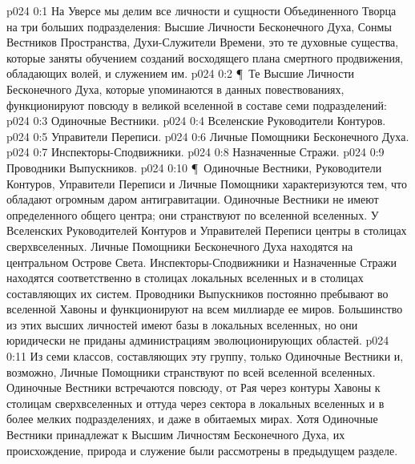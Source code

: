 \vs p024 0:1 На Уверсе мы делим все личности и сущности Объединенного Творца на три больших подразделения: Высшие Личности Бесконечного Духа, Сонмы Вестников Пространства, Духи\hyp{}Служители Времени, это те духовные существа, которые заняты обучением созданий восходящего плана смертного продвижения, обладающих волей, и служением им.
\vs p024 0:2 \P\ Те Высшие Личности Бесконечного Духа, которые упоминаются в данных повествованиях, функционируют повсюду в великой вселенной в составе семи подразделений:
\vs p024 0:3 \bibnobreakspace Одиночные Вестники.
\vs p024 0:4 \bibnobreakspace Вселенские Руководители Контуров.
\vs p024 0:5 \bibnobreakspace Управители Переписи.
\vs p024 0:6 \bibnobreakspace Личные Помощники Бесконечного Духа.
\vs p024 0:7 \bibnobreakspace Инспекторы\hyp{}Сподвижники.
\vs p024 0:8 \bibnobreakspace Назначенные Стражи.
\vs p024 0:9 \bibnobreakspace Проводники Выпускников.
\vs p024 0:10 \P\ Одиночные Вестники, Руководители Контуров, Управители Переписи и Личные Помощники характеризуются тем, что обладают огромным даром антигравитации. Одиночные Вестники не имеют определенного общего центра; они странствуют по вселенной вселенных. У Вселенских Руководителей Контуров и Управителей Переписи центры в столицах сверхвселенных. Личные Помощники Бесконечного Духа находятся на центральном Острове Света. Инспекторы\hyp{}Сподвижники и Назначенные Стражи находятся соответственно в столицах локальных вселенных и в столицах составляющих их систем. Проводники Выпускников постоянно пребывают во вселенной Хавоны и функционируют на всем миллиарде ее миров. Большинство из этих высших личностей имеют базы в локальных вселенных, но они юридически не приданы администрациям эволюционирующих областей.
\vs p024 0:11 Из семи классов, составляющих эту группу, только Одиночные Вестники и, возможно, Личные Помощники странствуют по всей вселенной вселенных. Одиночные Вестники встречаются повсюду, от Рая через контуры Хавоны к столицам сверхвселенных и оттуда через сектора в локальных вселенных и в более мелких подразделениях, и даже в обитаемых мирах. Хотя Одиночные Вестники принадлежат к Высшим Личностям Бесконечного Духа, их происхождение, природа и служение были рассмотрены в предыдущем разделе.
